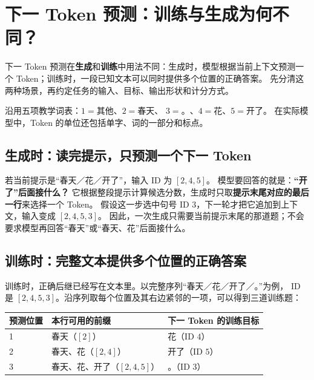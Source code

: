 \chapterrule
\section{下一 Token 预测：训练与生成为何不同？}
\label{intro:language-model-task}

下一 Token 预测在\textbf{生成}和\textbf{训练}中用法不同：生成时，模型根据当前上下文预测一个 Token；训练时，一段已知文本可以同时提供多个位置的正确答案。
先分清这两种场景，再约定任务的输入、目标、输出形状和计分方式。\label{concept:task-contract}

沿用五项教学词表：$1=\text{其他}$、$2=\text{春天}$、
$3=\text{。}$、$4=\text{花}$、$5=\text{开了}$。
在实际模型中，Token 的单位还包括单字、词的一部分和标点。

\subsection{生成时：读完提示，只预测一个下一 Token}

若当前提示是“春天／花／开了”，输入 ID 为 $[2,4,5]$。
模型要回答的就是：\textbf{“开了”后面接什么？}
它根据整段提示计算候选分数，生成时只取\textbf{提示末尾对应的最后一行}来选择一个 Token。
假设这一步选中句号 ID $3$，下一轮才把它追加到上下文，输入变成 $[2,4,5,3]$。
因此，一次生成只需要当前提示末尾的那道题；不会要求模型再回答“春天”或“春天、花”后面接什么。

\subsection{训练时：完整文本提供多个位置的正确答案}

训练时，正确后继已经写在文本里。以完整序列“春天／花／开了／。”为例，
ID 是 $[2,4,5,3]$。沿序列取每个位置及其右边紧邻的一项，可以得到三道训练题：

\begin{center}\small
{}
\begin{tabularx}{\linewidth}{@{}p{19mm}Xp{38mm}@{}}
\toprule
预测位置 & 本行可用的前缀 & 下一 Token 的训练目标\\\midrule
1 & 春天（$[2]$） & 花（ID $4$）\\
2 & 春天、花（$[2,4]$） & 开了（ID $5$）\\
3 & 春天、花、开了（$[2,4,5]$） & 。\quad（ID $3$）\\
\bottomrule
\end{tabularx}
\end{center}

